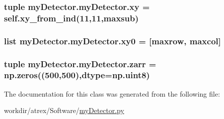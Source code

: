\hypertarget{classmy_detector_1_1my_detector_aeb28c7375533c3ec81727b7176f116ed}{
\subsubsection[{xy}]{\setlength{\rightskip}{0pt plus 5cm}tuple my\-Detector.\-my\-Detector.\-xy = self.\-xy\-\_\-from\-\_\-ind(11,11,{\bf maxsub})\hspace{0.3cm}{\ttfamily [static]}}}\label{classmy_detector_1_1my_detector_aeb28c7375533c3ec81727b7176f116ed}
\hypertarget{classmy_detector_1_1my_detector_ac41c95e8050c844f716b64f39fdc65fc}{
\subsubsection[{xy0}]{\setlength{\rightskip}{0pt plus 5cm}list my\-Detector.\-my\-Detector.\-xy0 = \mbox{[}{\bf maxrow}, {\bf maxcol}\mbox{]}\hspace{0.3cm}{\ttfamily [static]}}}\label{classmy_detector_1_1my_detector_ac41c95e8050c844f716b64f39fdc65fc}
\hypertarget{classmy_detector_1_1my_detector_a5073be601ea77b2b69921ccf0de09f95}{
\subsubsection[{zarr}]{\setlength{\rightskip}{0pt plus 5cm}tuple my\-Detector.\-my\-Detector.\-zarr = np.\-zeros((500,500),dtype=np.\-uint8)\hspace{0.3cm}{\ttfamily [static]}}}\label{classmy_detector_1_1my_detector_a5073be601ea77b2b69921ccf0de09f95}


The documentation for this class was generated from the following file\-:\begin{DoxyCompactItemize}
\item 
workdir/atrex/\-Software/\hyperlink{my_detector_8py}{my\-Detector.\-py}\end{DoxyCompactItemize}
